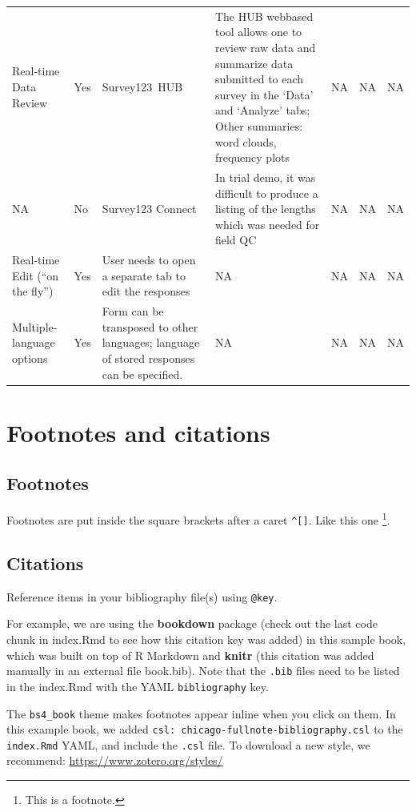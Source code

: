 \documentclass[
]{book}
\theoremstyle{definition}
\theoremstyle{definition}
\theoremstyle{definition}
\theoremstyle{definition}
\theoremstyle{remark}
\begin{document}
\begin{longtable}[t]{lllllrl}
\addlinespace
Real-time Data Review & Yes & Survey123 HUB & The HUB webbased tool allows one to review raw data and summarize data submitted to each survey in the ‘Data’ and ‘Analyze’ tabs; Other summaries: word clouds, frequency plots & NA & NA & NA\\
NA & No & Survey123 Connect & In trial demo, it was difficult to produce a listing of the lengths which was needed for field QC & NA & NA & NA\\
Real-time Edit (“on the fly”) & Yes & User needs to open a separate tab to edit the responses & NA & NA & NA & NA\\
Multiple-language options & Yes & Form can be transposed to other languages; language of stored responses can be specified. & NA & NA & NA & NA\\
\bottomrule
\end{longtable}

\hypertarget{footnotes-and-citations}{%
\chapter{Footnotes and citations}\label{footnotes-and-citations}}

\hypertarget{footnotes}{%
\section{Footnotes}\label{footnotes}}

Footnotes are put inside the square brackets after a caret \texttt{\^{}{[}{]}}. Like this one \footnote{This is a footnote.}.

\hypertarget{citations}{%
\section{Citations}\label{citations}}

Reference items in your bibliography file(s) using \texttt{@key}.

For example, we are using the \textbf{bookdown} package \citep{R-bookdown} (check out the last code chunk in index.Rmd to see how this citation key was added) in this sample book, which was built on top of R Markdown and \textbf{knitr} \citep{xie2015} (this citation was added manually in an external file book.bib).
Note that the \texttt{.bib} files need to be listed in the index.Rmd with the YAML \texttt{bibliography} key.

The \texttt{bs4\_book} theme makes footnotes appear inline when you click on them. In this example book, we added \texttt{csl:\ chicago-fullnote-bibliography.csl} to the \texttt{index.Rmd} YAML, and include the \texttt{.csl} file. To download a new style, we recommend: \url{https://www.zotero.org/styles/}
\end{document}
